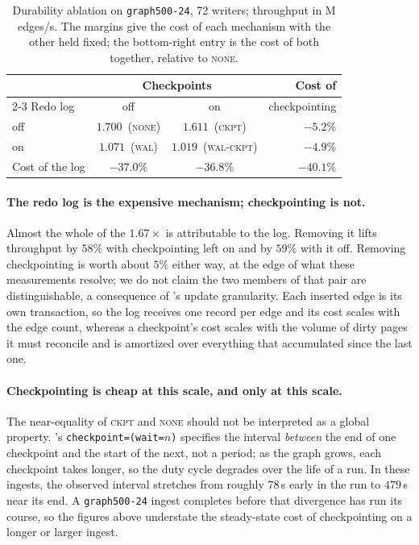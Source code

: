 \begin{table}[t]
  \centering
  \setlength{\tabcolsep}{5pt}\renewcommand{\arraystretch}{1.05}
  \small
  \begin{tabular}{l cc r}
  \toprule
                  & \multicolumn{2}{c}{Checkpoints} & Cost of \\
  \cmidrule(lr){2-3}
  Redo log        & off & on & checkpointing \\
  \midrule
  off             & $1.700$~(\textsc{none}) & $1.611$~(\textsc{ckpt})     & $-5.2\%$ \\
  on              & $1.071$~(\textsc{wal})  & $1.019$~(\textsc{wal-ckpt}) & $-4.9\%$ \\
  \midrule
  Cost of the log & $-37.0\%$               & $-36.8\%$                   & $-40.1\%$ \\
  \bottomrule
  \end{tabular}
  \caption{Durability ablation on \texttt{graph500-24}, 72 writers; throughput in
  M edges/s. The margins give the cost of each mechanism with the other held
  fixed; the bottom-right entry is the cost of both together, relative to
  \textsc{none}.}
  \label{tab:durability-ablation}
\end{table}

\paragraph{The redo log is the expensive mechanism; checkpointing is not.}
Almost the whole of the $1.67\times$ is attributable to the log.
Removing it lifts throughput by $58\%$ with checkpointing left on and by $59\%$ with it off.
Removing checkpointing is worth about $5\%$ either way, at the edge of what these measurements resolve; we do not claim the two members of that pair are distinguishable, a consequence of \project{}'s update granularity.
Each inserted edge is its own \wt{} transaction, so the log receives one record per edge and its cost scales with the edge count, whereas a checkpoint's cost scales with the volume of dirty pages it must reconcile and is amortized over everything that accumulated since the last one.

\paragraph{Checkpointing is cheap at this scale, and only at this scale.}
The near-equality of \textsc{ckpt} and \textsc{none} should not be interpreted as a global property.
\wt{}'s \texttt{checkpoint=(\allowbreak wait=$n$)} specifies the interval \emph{between} the end of one checkpoint and the start of the next, not a period; as the graph grows, each checkpoint takes longer, so the duty cycle degrades over the life of a run.
In these ingests, the observed interval stretches from roughly $78$\,s early in the run to $479$\,s near its end.
A \texttt{graph500-24} ingest completes before that divergence has run its course, so the figures above understate the steady-state cost of checkpointing on a longer or larger ingest.

